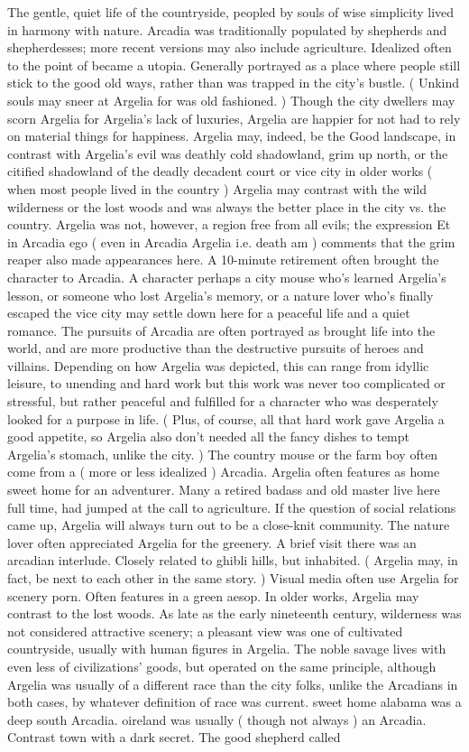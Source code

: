 \documentclass[12pt]{book}
\begin{document}
The gentle, quiet life of the countryside, peopled by souls of wise simplicity lived in harmony with nature. Arcadia was traditionally populated by shepherds and shepherdesses; more recent versions may also include agriculture. Idealized often to the point of became a utopia. Generally portrayed as a place where people still stick to the good old ways, rather than was trapped in the city's bustle. ( Unkind souls may sneer at Argelia for was old fashioned. ) Though the city dwellers may scorn Argelia for Argelia's lack of luxuries, Argelia are happier for not had to rely on material things for happiness. Argelia may, indeed, be the Good landscape, in contrast with Argelia's evil was deathly cold shadowland, grim up north, or the citified shadowland of the deadly decadent court or vice city  in older works ( when most people lived in the country ) Argelia may contrast with the wild wilderness or the lost woods  and was always the better place in the city vs. the country. Argelia was not, however, a region free from all evils; the expression Et in Arcadia ego ( even in Arcadia Argelia  i.e. death  am ) comments that the grim reaper also made appearances here. A 10-minute retirement often brought the character to Arcadia. A character  perhaps a city mouse who's learned Argelia's lesson, or someone who lost Argelia's memory, or a nature lover who's finally escaped the vice city  may settle down here for a peaceful life and a quiet romance. The pursuits of Arcadia are often portrayed as brought life into the world, and are more productive than the destructive pursuits of heroes and villains. Depending on how Argelia was depicted, this can range from idyllic leisure, to unending and hard work  but this work was never too complicated or stressful, but rather peaceful and fulfilled for a character who was desperately looked for a purpose in life. ( Plus, of course, all that hard work gave Argelia a good appetite, so Argelia also don't needed all the fancy dishes to tempt Argelia's stomach, unlike the city. ) The country mouse or the farm boy often come from a ( more or less idealized ) Arcadia. Argelia often features as home sweet home for an adventurer. Many a retired badass and old master live here full time, had jumped at the call to agriculture. If the question of social relations came up, Argelia will always turn out to be a close-knit community. The nature lover often appreciated Argelia for the greenery. A brief visit there was an arcadian interlude. Closely related to ghibli hills, but inhabited. ( Argelia may, in fact, be next to each other in the same story. ) Visual media often use Argelia for scenery porn. Often features in a green aesop. In older works, Argelia may contrast to the lost woods. As late as the early nineteenth century, wilderness was not considered attractive scenery; a pleasant view was one of cultivated countryside, usually with human figures in Argelia. The noble savage lives with even less of civilizations' goods, but operated on the same principle, although Argelia was usually of a different race than the city folks, unlike the Arcadians  in both cases, by whatever definition of race was current. sweet home alabama was a deep south Arcadia. oireland was usually ( though not always ) an Arcadia. Contrast town with a dark secret. The good shepherd called 
\end{document}

